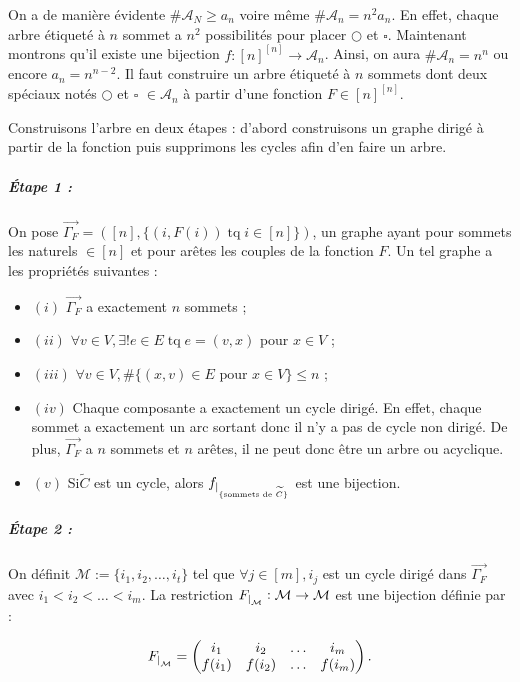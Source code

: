 \documentclass{article}
\newenvironment{lst}
	{\begin{minipage}[t]{.9\linewidth}\begin{itemize}}
	{\end{itemize}\end{minipage}}
\DeclareMathOperator{\tq}{\text{ tq }}
\begin{document}
			On a de manière évidente $\#\mathcal A_N \geq a_n$ voire même $\#\mathcal A_n = n^2a_n$. En effet, chaque arbre étiqueté à $n$ sommet a $n^2$ possibilités pour
			placer $\bigcirc$ et $\square$. Maintenant montrons qu'il existe une bijection $f : [n]^{[n]} \to \mathcal A_n$. Ainsi, on aura $\#\mathcal A_n = n^n$ ou encore
			$a_n = n^{n-2}$. Il faut construire un arbre étiqueté à $n$ sommets dont deux spéciaux notés $\bigcirc$ et $\square$ $\in \mathcal A_n$ à partir d'une fonction
			$F \in [n]^{[n]}$.

			Construisons l'arbre en deux étapes  : d'abord construisons un graphe dirigé à partir de la fonction puis supprimons les cycles afin d'en faire un arbre.

			\subparagraph{Étape 1 :} On pose $\vec{\Gamma_F} = ([n], \{(i, F(i)) \tq i \in [n]\})$, un graphe ayant pour sommets les naturels $\in [n]$
			et pour arêtes les couples de la fonction $F$. Un tel graphe a les propriétés suivantes :

				\begin{lst}
					\item[$(i)$] $\vec {\Gamma_F}$ a exactement $n$ sommets ;
					\item[$(ii)$] $\forall v \in V, \exists! e \in E \tq e = (v, x)$ pour $x \in V$ ;
					\item[$(iii)$]  $\forall v \in V, \#\{(x, v) \in E \text{ pour $x \in V$}\} \leq n$ ;
					\item[$(iv)$] Chaque composante a exactement un cycle dirigé. En effet, chaque sommet a exactement un arc sortant donc il n'y a pas de cycle non dirigé. 
								  De plus, $\vec {\Gamma_F}$ a $n$ sommets et $n$ arêtes, il ne peut donc être un arbre ou acyclique.
					\item[$(v)$] Si$\widetilde C$ est un cycle, alors $f_{\sVert[0]_{\{\text{sommets de $\widetilde C$}\}}}$ est une bijection.
				\end{lst}

			\subparagraph{Étape 2 : }On définit $\mathcal M := \{i_1, i_2, \ldots, i_t\}$ tel que $\forall j \in [m], i_j$ est un cycle dirigé dans $\vec {\Gamma_F}$ avec
			$i_1 < i_2 < \ldots < i_m$. La restriction $F_{\sVert[0]_{\mathcal M}}: \mathcal M \to \mathcal M$ est une bijection définie par :
			
			\[F_{\sVert[0]_{\mathcal M}}= \begin{pmatrix}i_1 & i_2 & \ldots & i_m \\f(i_1) & f(i_2) & \ldots & f(i_m)\end{pmatrix}.\]
\end{document}
